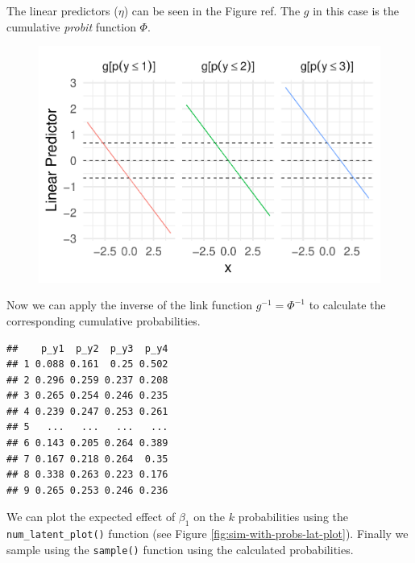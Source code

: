 \documentclass[
  man,floatsintext]{apa6}
\begin{document}
\scriptsize

\normalsize

The linear predictors (\(\eta\)) can be seen in the Figure ref. The \(g\) in this case is the cumulative \emph{probit} function \(\Phi\).

\scriptsize

\begin{figure}

{\centering \includegraphics{paper-new_files/figure-latex/unnamed-chunk-6-1} 

}

\caption{ }\label{fig:unnamed-chunk-6}
\end{figure}

\normalsize

Now we can apply the inverse of the link function \(g^{-1} = \Phi^{-1}\) to calculate the corresponding cumulative probabilities.

\scriptsize

\normalsize

\scriptsize

\begin{verbatim}
##    p_y1  p_y2  p_y3  p_y4
## 1 0.088 0.161  0.25 0.502
## 2 0.296 0.259 0.237 0.208
## 3 0.265 0.254 0.246 0.235
## 4 0.239 0.247 0.253 0.261
## 5   ...   ...   ...   ...
## 6 0.143 0.205 0.264 0.389
## 7 0.167 0.218 0.264  0.35
## 8 0.338 0.263 0.223 0.176
## 9 0.265 0.253 0.246 0.236
\end{verbatim}

\normalsize

We can plot the expected effect of \(\beta_1\) on the \(k\) probabilities using the \texttt{num\_latent\_plot()} function (see Figure \ref{fig:sim-with-probs-lat-plot}). Finally we sample using the \texttt{sample()} function using the calculated probabilities.
\end{document}
